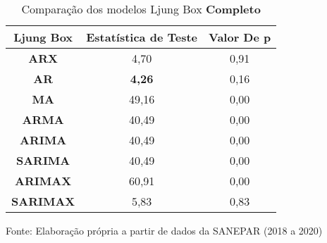 \begin{table}[H]
	\centering
	\caption{Comparação dos modelos Ljung Box \textbf{Completo} }\label{tb:lbcm}
	\begin{tabular}{@{}ccc@{}}
		\toprule
		\textbf{Ljung Box} & \textbf{Estatística de Teste} & \textbf{Valor De p} \\ \midrule
\textbf{ARX}       & 4,70                          & 0,91                \\
\textbf{AR}        & \textbf{4,26}                          & 0,16                \\
\textbf{MA}        & 49,16                         & 0,00                \\
\textbf{ARMA}      & 40,49                         & 0,00                \\
\textbf{ARIMA}     & 40,49                         & 0,00                \\
\textbf{SARIMA}    & 40,49                         & 0,00                \\
\textbf{ARIMAX}    & 60,91                         & 0,00                \\
\textbf{SARIMAX}   & 5,83                          & 0,83                \\ \bottomrule
	\end{tabular}

	
	Fonte: Elaboração própria a partir de dados da SANEPAR (2018 a 2020)
\end{table}

